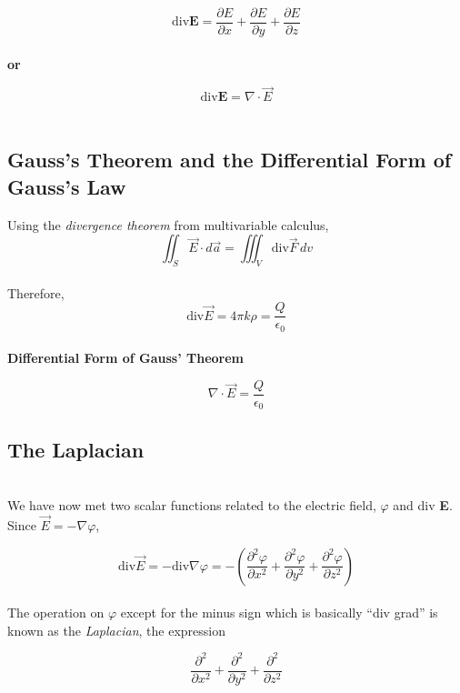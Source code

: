 \documentclass[svgnames]{article}
\begin{document}
\[ \text{div} \textbf{E} = \frac{\partial E}{\partial x} + \frac{\partial
E}{\partial y} + \frac{\partial E}{\partial z} \]\\

\textbf{or} 

\[ \text{div} \textbf{E} = \nabla \cdot \vec{E} \] \\

\subsection{Gauss's Theorem and the Differential Form of Gauss's Law}

Using the \textit{divergence theorem} from multivariable calculus, \\

\[ \iint_S \vec{E} \cdot d\vec{a} = \iiint_V \text{div} \vec{F} \, dv \]\\ 

Therefore,  \\

\[ \text{div} \vec{E} = 4 \pi k \rho = \frac{Q}{\epsilon_0} \] \\

\textbf{Differential Form of Gauss' Theorem} \\
\begin{tcolorbox}[colback = blue!5!white, colframe = blue!50!black]
\[ \nabla \cdot \vec{E} = \frac{Q}{\epsilon_0} \]  
\end{tcolorbox}

\subsection{The Laplacian} \mbox{} \\ 

We have now met two scalar functions related to the electric field, $\varphi$ and div \textbf{E}. \\

Since $\vec{E} = -\nabla \varphi$, 

\[ \text{div} \vec{E} = - \text{div} \nabla \varphi = -\left(\frac{\partial^2
\varphi}{\partial x^2} + \frac{\partial^2 \varphi}{\partial y^2}
+ \frac{\partial^2 \varphi}{\partial z^2}\right) \] \\

The operation on $\varphi$ except for the minus sign which is basically ``div
grad'' is known as the \textit{Laplacian}, the expression

\[ \frac{\partial^2}{\partial x^2} + \frac{\partial^2 }{\partial y^2} + \frac{\partial^2}{\partial z^2} \] \\ 
\end{document}
